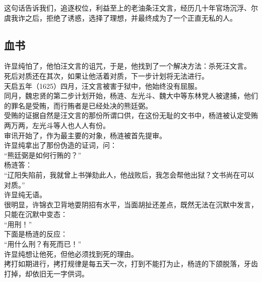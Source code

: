 \begin{multicols}{\theparacolNo}
这句话告诉我们，追逐权位，利益至上的老油条汪文言，经历几十年官场沉浮、尔虞我诈之后，拒绝了诱惑，选择了理想，并最终成为了一个正直无私的人。\\

\subsection{血书}
许显纯怕了，他怕汪文言的诅咒，于是，他找到了一个解决方法：杀死汪文言。\\

死后对质还在其次，如果让他活着对质，下一步计划将无法进行。\\

天启五年（1625）四月，汪文言被害于狱中，他始终没有屈服。\\

同月，魏忠贤的第二步计划开始，杨涟、左光斗、魏大中等东林党人被逮捕，他们的罪名是受贿，而行贿者是已经处决的熊廷弼。\\

受贿的证据自然是汪文言的那份所谓口供，在这份无耻的文书中，杨涟被认定受贿两万两，左光斗等人也人人有份。\\

审讯开始了，作为最主要的对象，杨涟被首先提审。\\

许显纯拿出了那份伪造的证词，问：\\

“熊廷弼是如何行贿的？”\\

杨涟答：\\

“辽阳失陷前，我就曾上书弹劾此人，他战败后，我怎会帮他出狱？文书尚在可以对质。”\\

许显纯无语。\\

很明显，许锦衣卫背地耍阴招有水平，当面胡扯还差点，既然无法在沉默中发言，只能在沉默中变态：\\

“用刑！”\\

下面是杨涟的反应：\\

“用什么刑？有死而已！”\\

许显纯想让他死，但他必须找到死的理由。\\

拷打如期进行，拷打规律是每五天一次，打到不能打为止，杨涟的下颌脱落，牙齿打掉，却依旧无一字供词。\\


\end{multicols}
